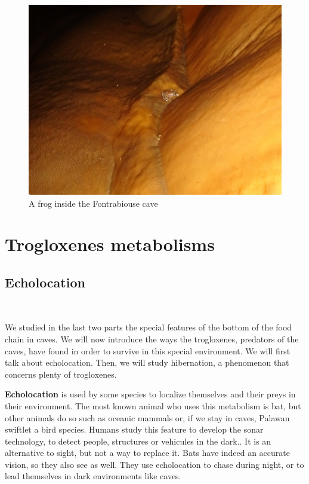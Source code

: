 \documentclass[draft, final]{report}
\begin{document}
\begin{figure}[!ht]
  \centering
  \includegraphics[scale=0.3]{LateX/Images/frog3.png}
  \caption{A frog inside the Fontrabiouse cave}
\end{figure}

\newpage
\chapter{Trogloxenes metabolisms}
\section{Echolocation}
~\par
We studied in the last two parts the special features of the bottom of the food chain in caves. We will now introduce the ways the trogloxenes, predators of the caves, have found in order to survive in this special environment. We will first talk about echolocation. Then, we will study hibernation, a phenomenon that concerns plenty of trogloxenes.\\
\par

\textbf{Echolocation} is used by some species to localize themselves and their preys in their environment. The most known animal who uses this metabolism is bat,  but other animals do so such as
oceanic mammals or, if we stay in caves, Palawan swiftlet a bird species. Humans study this feature to develop the sonar technology, to detect people,
structures or vehicules in the dark.. It is an alternative to sight, but not a way to replace it. Bats have indeed an accurate vision, so they also see as well. They use echolocation to chase during night, or to lead themselves in dark environments like caves.\\
\end{document}

